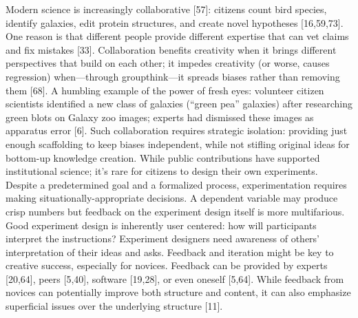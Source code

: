 Modern science is increasingly collaborative
[57]: citizens count bird species, identify galaxies, edit protein structures, and create novel hypotheses [16,59,73]. One reason is that different people provide different expertise that can vet
claims and fix mistakes [33]. Collaboration benefits creativity when it brings different perspectives that build on each other; it impedes creativity (or worse, causes regression) when—through
groupthink—it spreads biases rather than removing them [68]. A humbling example of the power
of fresh eyes: volunteer citizen scientists identified a new class of galaxies (“green pea” galaxies)
after researching green blots on Galaxy zoo images; experts had dismissed these images as apparatus error [6]. Such collaboration requires strategic isolation: providing just enough scaffolding
to keep biases independent, while not stifling original ideas for bottom-up knowledge creation.
While public contributions have supported institutional science; it’s rare for citizens to design
their own experiments. Despite a predetermined goal and a formalized process, experimentation
requires making situationally-appropriate decisions. A dependent variable may produce crisp
numbers but feedback on the experiment design itself is more multifarious. Good experiment
design is inherently user centered: how will participants interpret the instructions? Experiment
designers need awareness of others’ interpretation of their ideas and asks. Feedback and iteration
might be key to creative success, especially for novices. Feedback can be provided by experts
[20,64], peers [5,40], software [19,28], or even oneself [5,64]. While feedback from novices can
potentially improve both structure and content, it can also emphasize superficial issues over the
underlying structure [11].






